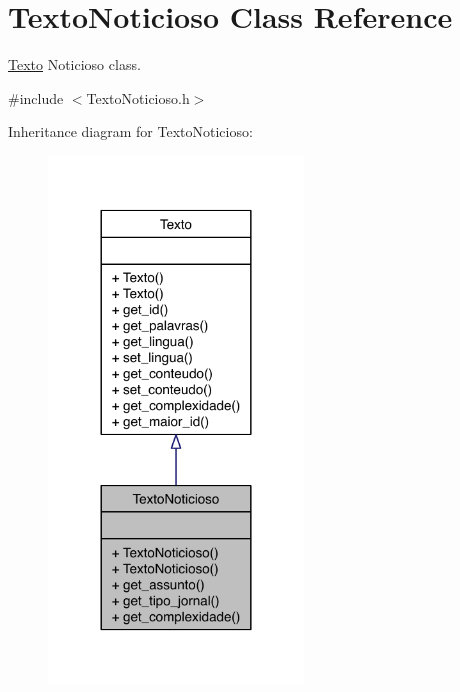 \hypertarget{class_texto_noticioso}{\section{Texto\-Noticioso Class Reference}
\label{class_texto_noticioso}
}


\hyperlink{class_texto}{Texto} Noticioso class.  




{\ttfamily \#include $<$Texto\-Noticioso.\-h$>$}



Inheritance diagram for Texto\-Noticioso\-:
\nopagebreak
\begin{figure}[H]
\begin{center}
\leavevmode
\includegraphics[width=192pt]{class_texto_noticioso__inherit__graph}
\end{center}
\end{figure}
